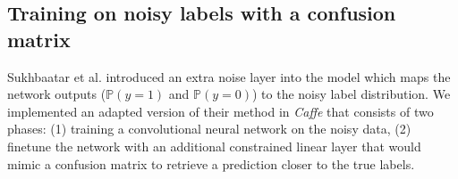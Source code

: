 \documentclass[a4paper]{article}
\newcommand{\p}{\mathbb{P}}
\begin{document}
    \subsection{Training on noisy labels with a confusion matrix} \label{sec:Qmatrix}
        Sukhbaatar et al.\cite{FB} introduced an extra noise layer into the model which maps the network outputs ($\p(y=1)$ and $\p(y=0)$) to  the noisy label distribution.
        We implemented an adapted version of their method in \textit{Caffe} that consists of two phases: (1) training a convolutional neural network on the noisy data, (2) finetune the network with an additional constrained linear layer that would mimic a confusion matrix to retrieve a prediction closer to the true labels. 
\end{document}
